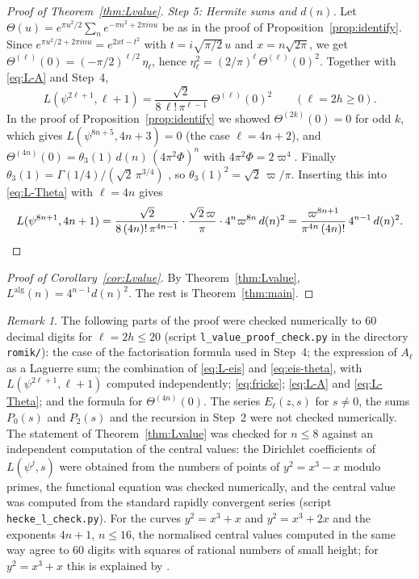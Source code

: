 \documentclass[11pt]{amsart}
\theoremstyle{definition}
\theoremstyle{remark}
\newtheorem{remark}[theorem]{Remark}
\begin{document}
\begin{proof}[Proof of Theorem~\ref{thm:Lvalue}]
\emph{Step 5: Hermite sums and $d(n)$.} Let $\Theta(u)=e^{\pi u^2/2}\sum_ne^{-\pi n^2+2\pi inu}$ be
as in the proof of Proposition~\ref{prop:identify}. Since
$e^{\pi u^2/2+2\pi inu}=e^{2xt-t^2}$ with $t=i\sqrt{\pi/2}\,u$ and $x=n\sqrt{2\pi}$, we get
$\Theta^{(\ell)}(0)=(-\pi/2)^{\ell/2}\,\eta_\ell$, hence $\eta_\ell^2=(2/\pi)^\ell\,\Theta^{(\ell)}(0)^2$. Together
with \eqref{eq:L-A} and Step~4,
\begin{equation}\label{eq:L-Theta}
L(\psi^{2\ell+1},\ell+1)=\frac{\sqrt2}{8\,\ell!\,\pi^{\ell-1}}\;\Theta^{(\ell)}(0)^2\qquad(\ell=2h\ge0).
\end{equation}
In the proof of Proposition~\ref{prop:identify} we showed $\Theta^{(2k)}(0)=0$ for odd $k$, which
gives $L(\psi^{8n+5},4n+3)=0$ (the case $\ell=4n+2$), and
$\Theta^{(4n)}(0)=\theta_3(1)\,d(n)\,(4\pi^2\Phi)^n$ with $4\pi^2\Phi=2\varpi^4$. Finally
$\theta_3(1)=\Gamma(1/4)/(\sqrt2\,\pi^{3/4})$ \cite[Section~1]{Romik}, so
$\theta_3(1)^2=\sqrt2\,\varpi/\pi$. Inserting this into \eqref{eq:L-Theta} with $\ell=4n$ gives
\[
L(\psi^{8n+1},4n+1)=\frac{\sqrt2}{8\,(4n)!\,\pi^{4n-1}}\cdot\frac{\sqrt2\,\varpi}{\pi}\cdot
4^n\varpi^{8n}\,d(n)^2=\frac{\varpi^{8n+1}}{\pi^{4n}\,(4n)!}\,4^{n-1}\,d(n)^2 .\qedhere
\]
\end{proof}

\begin{proof}[Proof of Corollary~\ref{cor:Lvalue}]
By Theorem~\ref{thm:Lvalue}, $L^{\mathrm{alg}}(n)=4^{n-1}d(n)^2$. The rest is
Theorem~\ref{thm:main}.
\end{proof}

\begin{remark}\label{rem:Lcheck}
The following parts of the proof were checked numerically to $60$ decimal digits for
$\ell=2h\le20$ (script \texttt{l\_value\_proof\_check.py} in the directory \texttt{romik/}): the
case of the factorisation formula used in Step~4; the expression of $A_\ell$ as a Laguerre sum;
the combination of \eqref{eq:L-eis} and \eqref{eq:eis-theta}, with $L(\psi^{2\ell+1},\ell+1)$ computed
independently; \eqref{eq:fricke}; \eqref{eq:L-A} and \eqref{eq:L-Theta}; and the formula for
$\Theta^{(4n)}(0)$. The series $E_\ell(z,s)$ for $s\ne0$, the sums $P_0(s)$ and $P_2(s)$ and the
recursion in Step~2 were not checked numerically. The statement of
Theorem~\ref{thm:Lvalue} was checked for $n\le8$ against an independent computation of the
central values:
the Dirichlet coefficients of $L(\psi^j,s)$ were obtained from the numbers of points of
$y^2=x^3-x$ modulo primes, the functional equation was checked numerically, and the central
value was computed from the standard rapidly convergent series (script
\texttt{hecke\_l\_check.py}). For the curves $y^2=x^3+x$ and $y^2=x^3+2x$ and the exponents
$4n+1$, $n\le16$, the normalised central values computed in the same way agree to $60$ digits with
squares of rational numbers of small height; for $y^2=x^3+x$ this is explained by
\cite[Theorem~2.10]{Nomoto}.
\end{remark}
\end{document}
